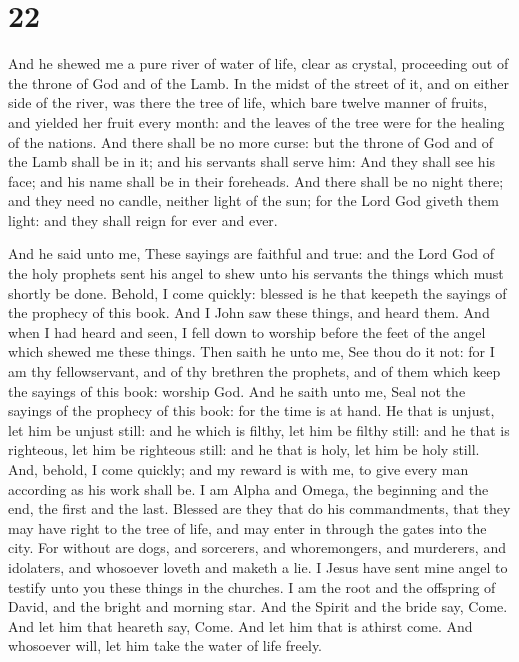 \hypertarget{section-21}{%
\section{22}\label{section-21}}

 And he shewed me a pure river of water of life, clear as
crystal, proceeding out of the throne of God and of the Lamb.
 In the midst of the street of it, and on either side of
the river, was there the tree of life, which bare twelve manner of
fruits, and yielded her fruit every month: and the leaves of the tree
were for the healing of the nations.  And there shall be
no more curse: but the throne of God and of the Lamb shall be in it; and
his servants shall serve him:  And they shall see his
face; and his name shall be in their foreheads.  And there
shall be no night there; and they need no candle, neither light of the
sun; for the Lord God giveth them light: and they shall reign for ever
and ever.

 And he said unto me, These sayings are faithful and true:
and the Lord God of the holy prophets sent his angel to shew unto his
servants the things which must shortly be done.  Behold, I
come quickly: blessed is he that keepeth the sayings of the prophecy of
this book.  And I John saw these things, and heard them.
And when I had heard and seen, I fell down to worship before the feet of
the angel which shewed me these things.  Then saith he
unto me, See thou do it not: for I am thy fellowservant, and of thy
brethren the prophets, and of them which keep the sayings of this book:
worship God.  And he saith unto me, Seal not the sayings
of the prophecy of this book: for the time is at hand. 
He that is unjust, let him be unjust still: and he which is filthy, let
him be filthy still: and he that is righteous, let him be righteous
still: and he that is holy, let him be holy still.  And,
behold, I come quickly; and my reward is with me, to give every man
according as his work shall be.  I am Alpha and Omega,
the beginning and the end, the first and the last. 
Blessed are they that do his commandments, that they may have right to
the tree of life, and may enter in through the gates into the city.
 For without are dogs, and sorcerers, and whoremongers,
and murderers, and idolaters, and whosoever loveth and maketh a lie.
 I Jesus have sent mine angel to testify unto you these
things in the churches. I am the root and the offspring of David, and
the bright and morning star.  And the Spirit and the
bride say, Come. And let him that heareth say, Come. And let him that is
athirst come. And whosoever will, let him take the water of life freely.

